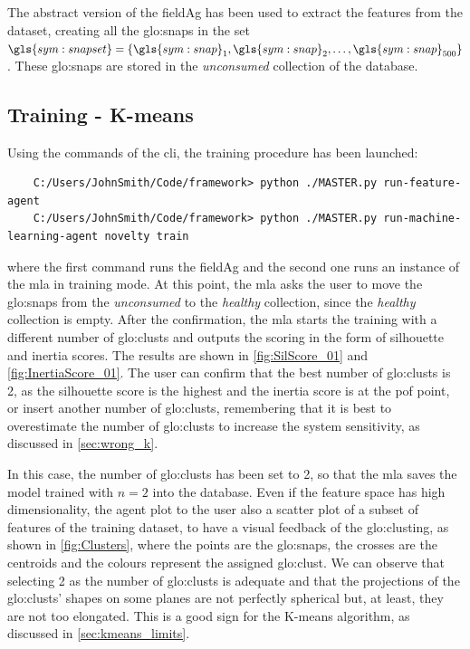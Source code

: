 The abstract version of the \gls{fieldAg} has been used to extract the features from the dataset, creating all the \gls{glo:snap}s in the set $\gls{sym:snapset}=\{\gls{sym:snap}_1,\gls{sym:snap}_2,\dots,\gls{sym:snap}_{500}\}$. These \gls{glo:snap}s are stored in the \emph{unconsumed} collection of the database.

\subsection{Training - K-means}

Using the commands of the \gls{cli}, the training procedure has been launched:
\begin{verbatim}
    C:/Users/JohnSmith/Code/framework> python ./MASTER.py run-feature-agent
    C:/Users/JohnSmith/Code/framework> python ./MASTER.py run-machine-learning-agent novelty train
\end{verbatim}

where the first command runs the \gls{fieldAg} and the second one runs an  instance of the \gls{mla} in training mode.
At this point, the \gls{mla} asks the user to move the \gls{glo:snap}s from the \emph{unconsumed} to the \emph{healthy} collection, since the \emph{healthy} collection is empty. After the confirmation, the \gls{mla} starts the training with a different number of \gls{glo:clust}s and outputs the scoring in the form of silhouette and inertia scores. The results are shown in \autoref{fig:SilScore_01} and \autoref{fig:InertiaScore_01}. The user can confirm that the best number of \gls{glo:clust}s is 2, as the silhouette score is the highest and the inertia score is at the \gls{pof} point, or insert another number of \gls{glo:clust}s, remembering that it is best to overestimate the number of \gls{glo:clust}s to increase the system sensitivity, as discussed in \autoref{sec:wrong_k}. 

In this case, the number of \gls{glo:clust}s has been set to 2, so that the \gls{mla} saves the model trained with $n=2$ into the database. Even if the feature space has high dimensionality, the agent plot to the user also a scatter plot of a subset of features of the training dataset, to have a visual feedback of the \gls{glo:clust}ing, as shown in \autoref{fig:Clusters}, where the points are the \gls{glo:snap}s, the crosses are the centroids and the colours represent the assigned \gls{glo:clust}. We can observe that selecting 2 as the number of \gls{glo:clust}s is adequate and that the projections of the \gls{glo:clust}s' shapes on some planes are not perfectly spherical but, at least, they are not too elongated. This is a good sign for the K-means algorithm, as discussed in \autoref{sec:kmeans_limits}.

